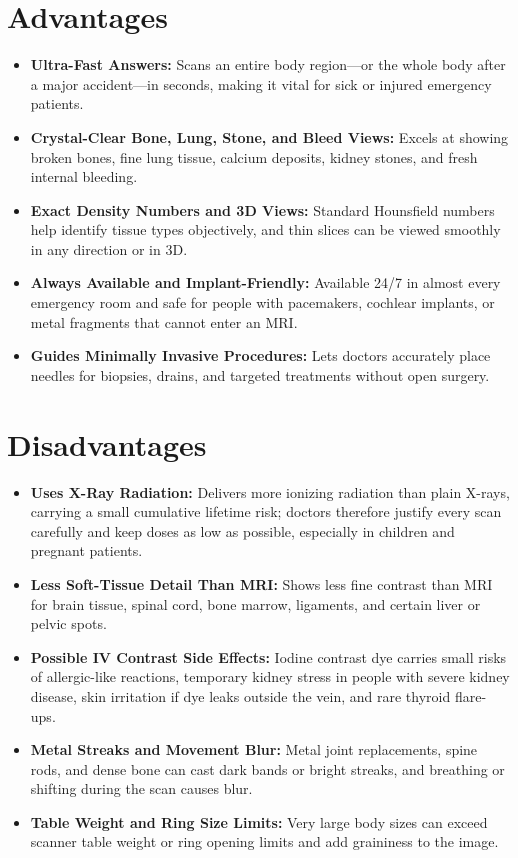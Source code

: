 \section{Advantages}
\begin{itemize}
    \item \textbf{Ultra-Fast Answers:} Scans an entire body region---or the whole body after a major accident---in seconds, making it vital for sick or injured emergency patients.
    \item \textbf{Crystal-Clear Bone, Lung, Stone, and Bleed Views:} Excels at showing broken bones, fine lung tissue, calcium deposits, kidney stones, and fresh internal bleeding.
    \item \textbf{Exact Density Numbers and 3D Views:} Standard Hounsfield numbers help identify tissue types objectively, and thin slices can be viewed smoothly in any direction or in 3D.
    \item \textbf{Always Available and Implant-Friendly:} Available 24/7 in almost every emergency room and safe for people with pacemakers, cochlear implants, or metal fragments that cannot enter an MRI.
    \item \textbf{Guides Minimally Invasive Procedures:} Lets doctors accurately place needles for biopsies, drains, and targeted treatments without open surgery.
\end{itemize}

\section{Disadvantages}
\begin{itemize}
    \item \textbf{Uses X-Ray Radiation:} Delivers more ionizing radiation than plain X-rays, carrying a small cumulative lifetime risk; doctors therefore justify every scan carefully and keep doses as low as possible, especially in children and pregnant patients.
    \item \textbf{Less Soft-Tissue Detail Than MRI:} Shows less fine contrast than MRI for brain tissue, spinal cord, bone marrow, ligaments, and certain liver or pelvic spots.
    \item \textbf{Possible IV Contrast Side Effects:} Iodine contrast dye carries small risks of allergic-like reactions, temporary kidney stress in people with severe kidney disease, skin irritation if dye leaks outside the vein, and rare thyroid flare-ups.
    \item \textbf{Metal Streaks and Movement Blur:} Metal joint replacements, spine rods, and dense bone can cast dark bands or bright streaks, and breathing or shifting during the scan causes blur.
    \item \textbf{Table Weight and Ring Size Limits:} Very large body sizes can exceed scanner table weight or ring opening limits and add graininess to the image.
\end{itemize}

